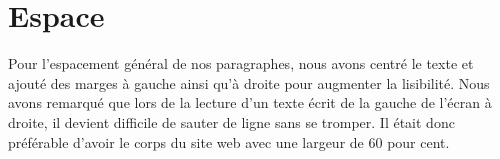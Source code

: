 \documentclass{article}
\begin{document}
\section{Espace}

Pour l'espacement général de nos paragraphes,
nous avons centré le texte et ajouté des marges à gauche ainsi qu'à droite pour augmenter la lisibilité.
Nous avons remarqué que lors de la lecture d'un texte écrit de la gauche de l'écran à droite,
il devient difficile de sauter de ligne sans se tromper.
Il était donc préférable d'avoir le corps du site web avec une largeur de 60 pour cent.
\end{document}
